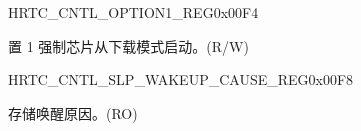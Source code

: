 \begin{register}{H}{RTC\_CNTL\_OPTION1\_REG}{0x00F4}\label{regdesc:RTCCNTLOPTION1REG}
%
%
\regnewline%
\begin{regdesc}\begin{reglist}
\label{fielddesc:RTCCNTLFORCEDOWNLOADBOOT}\item [RTC\_CNTL\_FORCE\_DOWNLOAD\_BOOT] 置 1 强制芯片从下载模式启动。(R/W)
\end{reglist}\end{regdesc}
\end{register}


\begin{register}{H}{RTC\_CNTL\_SLP\_WAKEUP\_CAUSE\_REG}{0x00F8}\label{regdesc:RTCCNTLSLPWAKEUPCAUSEREG}
%
%
\regnewline%
\begin{regdesc}\begin{reglist}
\label{fielddesc:RTCCNTLWAKEUPCAUSE}\item [RTC\_CNTL\_WAKEUP\_CAUSE] 存储唤醒原因。(RO)
\end{reglist}\end{regdesc}
\end{register}



